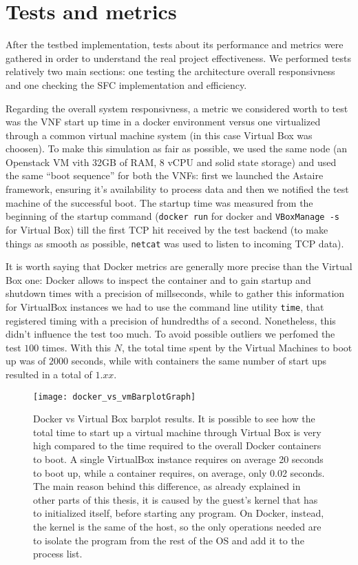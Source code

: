 \chapter{Tests and metrics}

After the testbed implementation, tests about its performance and metrics were 
gathered in order to understand the real project effectiveness. We performed 
tests relatively two main sections: one testing the architecture 
overall responsivness and one checking the SFC implementation and efficiency.

Regarding the overall system responsivness, a metric we considered worth to 
test was the VNF start up time in a docker environment versus one virtualized 
through a common virtual machine system (in this case Virtual Box was choosen). 
To make this simulation as fair as possible, we used the same node (an 
Openstack VM vith 32GB of RAM, 8 vCPU and solid state storage) and used the same 
``boot sequence'' for both the VNFs: first we launched the Astaire framework, 
ensuring it's availability to process data and then we notified the test 
machine of the successful boot. The startup time was measured from the 
beginning of the startup command (\verb!docker run! for docker and 
\verb!VBoxManage -s! for Virtual Box) till the first TCP hit received by the 
test backend (to make things as smooth as possible, \verb!netcat! was used 
to listen to incoming TCP data).

It is worth saying that Docker metrics are generally more precise than the 
Virtual Box one: Docker allows to inspect the container and to gain startup and 
shutdown times with a precision of millseconds, while to gather this 
information for VirtualBox instances we had to use the command line utility 
\verb!time!, that registered timing with a precision of hundredths of a 
second. Nonetheless, this didn't influence the test too much. To avoid possible 
outliers we perfomed the test $100$ times. With this $N$, the total time spent 
by the Virtual Machines to boot up was of $2000$ seconds, while with containers the same number of start ups resulted in a 
total of $1.xx$. %
\begin{figure}[t] %
 \centering
 \texttt{[image: docker\_vs\_vmBarplotGraph]}
 \caption[Docker vs Virtual Box barplot results]{Docker vs Virtual Box barplot 
results. It is possible to see how the total time to start up a virtual machine 
through Virtual Box is very high compared to the time required to the overall 
Docker containers to boot. A single VirtualBox instance requires on average 20 
seconds to boot up, while a container requires, on average, only 0.02 seconds. 
The main reason behind this difference, as already explained in other parts of 
this thesis, it is caused by the guest's kernel that has to initialized itself, 
before starting any program. On Docker, instead, the kernel is the same of the 
host, so the only operations needed are to isolate the program from the rest of 
the OS and add it to the process list.}
 \label{chap:tests:sec:dockervsvb:img:barplot}
\end{figure}


